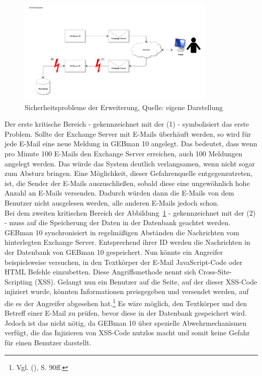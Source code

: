 \begin{figure}[h!]
\centering
\includegraphics[width=0.85\textwidth]{Abbildungen/Sicherheitsaspekte.pdf}
	\caption[Sicherheitsprobleme der Erweiterung]{Sicherheitsprobleme der Erweiterung, Quelle: eigene Darstellung}
	\label{fig:Sicherheitsprobleme}
\end{figure}

\noindent
Der erste kritische Bereich - gekennzeichnet mit der (1) - symbolisiert das erste Problem. Sollte der Exchange Server mit E-Mails überhäuft werden, so wird für jede E-Mail eine neue Meldung in GEBman 10 angelegt. Das bedeutet, dass wenn pro Minute 100 E-Mails den Exchange Server erreichen, auch 100 Meldungen angelegt werden. Das würde das System deutlich verlangsamen, wenn nicht sogar zum Absturz bringen. Eine Möglichkeit, dieser Gefahrenquelle entgegenzutreten, ist, die Sender der E-Mails auszuschließen, sobald diese eine ungewöhnlich hohe Anzahl an E-Mails versenden. Dadurch würden dann die E-Mails von dem Benutzer nicht ausgelesen werden, alle anderen E-Mails jedoch schon.\\

\noindent
Bei dem zweiten kritischen Bereich der Abbildung~\ref{fig:Sicherheitsprobleme} - gekennzeichnet mit der (2) - muss auf die Speicherung der Daten in der Datenbank geachtet werden. GEBman 10 synchronisiert in regelmäßigen Abständen die Nachrichten vom hinterlegten Exchange Server. Entsprechend ihrer ID werden die Nachrichten in der Datenbank von GEBman 10 gespeichert. Nun könnte ein Angreifer beispielsweise versuchen, in den Textkörper der E-Mail JavaScript-Code oder HTML Befehle einzubetten. Diese Angriffsmethode nennt sich Cross-Site-Scripting (XSS). Gelangt nun ein Benutzer auf die Seite, auf der dieser XSS-Code injiziert wurde, könnten Informationen preisgegeben und versendet werden, auf die es der Angreifer abgesehen hat.\footnote{Vgl. \citeauthor{Rohr} (\citeyear{Rohr}), S. 90ff.}\newline
Es wäre möglich, den Textkörper und den Betreff einer E-Mail zu prüfen, bevor diese in der Datenbank gespeichert wird. Jedoch ist das nicht nötig, da GEBman 10 über spezielle Abwehrmechanismen verfügt, die das Injizieren von XSS-Code nutzlos macht und somit keine Gefahr für einen Benutzer darstellt.

 

